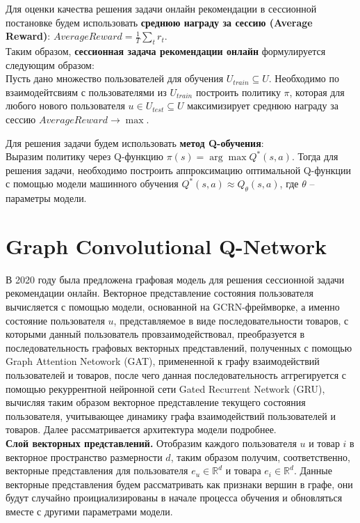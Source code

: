 \documentclass[a4paper,14pt,oneside]{mipt-thesis-ms}
\begin{document}
Для оценки качества решения задачи онлайн рекомендации в сессионной постановке будем использовать {\bf среднюю награду за сессию (Average Reward)}: $AverageReward = \frac1T \sum_t r_t$.\\

Таким образом, {\bf сессионная задача рекомендации онлайн} формулируется следующим образом:\\
Пусть дано множество пользователей для обучения $U_{train} \subseteq U$. Необходимо по взаимодейтсвиям с пользователями из $U_{train}$ построить политику $\pi$, которая для любого нового пользователя $u \in U_{test} \subseteq U$ максимизирует среднюю награду за сессию $AverageReward \rightarrow \max$.

Для решения задачи будем использовать {\bf метод Q-обучения\cite{watkins01}}: \\Выразим политику через Q-функцию $\pi(s) = \arg \max Q^*(s, a)$. Тогда для решения задачи, необходимо построить аппроксимацию оптимальной Q-функции с помощью модели машинного обучения $Q^*(s, a) \approx Q_{\theta}(s, a)$, где $\theta$ -- параметры модели.


\section{Graph Convolutional Q-Network}
В 2020 году была предложена графовая модель для решения сессионной задачи рекомендации онлайн. Векторное представление состояния пользователя вычисляется с помощью модели, основанной на GCRN-фреймворке, а именно состояние пользователя $u$, представляемое в виде последовательности товаров, с которыми данный пользователь провзаимодействовал, преобразуется в последовательность графовых векторных представлений, полученных с помощью Graph Attention Netowork (GAT), примененной к графу взаимодействий пользователей и товаров, после чего данная последовательность аггрегируется с помощью рекуррентной нейронной сети Gated Recurrent Network (GRU), вычисляя таким образом векторное представление текущего состояния пользователя, учитывающее динамику графа взаимодействий пользователей и товаров. Далее рассматривается архитектура модели подробнее.
\\

{\bf Слой векторных представлений.} Отобразим каждого пользователя $u$ и товар $i$ в векторное пространство размерности $d$, таким образом получим, соответственно, векторные представления для пользователя $e_u \in \mathbb{R}^d$ и товара $e_i \in \mathbb{R}^d$. Данные векторные представления будем рассматривать как признаки вершин в графе, они будут случайно проициализированы в начале процесса обучения и обновляться вместе с другими параметрами модели.\\
\end{document}
